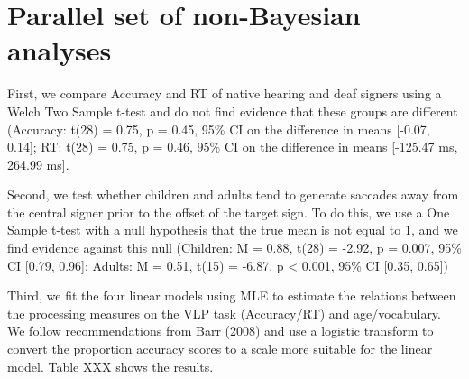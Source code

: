 \documentclass[oneside]{report}
\begin{document}
\section{Parallel set of non-Bayesian
analyses}\label{parallel-set-of-non-bayesian-analyses}

First, we compare Accuracy and RT of native hearing and deaf signers
using a Welch Two Sample t-test and do not find evidence that these
groups are different (Accuracy: t(28) = 0.75, p = 0.45, 95\% CI on the
difference in means {[}-0.07, 0.14{]}; RT: t(28) = 0.75, p = 0.46, 95\%
CI on the difference in means {[}-125.47 ms, 264.99 ms{]}.

Second, we test whether children and adults tend to generate saccades
away from the central signer prior to the offset of the target sign. To
do this, we use a One Sample t-test with a null hypothesis that the true
mean is not equal to 1, and we find evidence against this null
(Children: M = 0.88, t(28) = -2.92, p = 0.007, 95\% CI {[}0.79, 0.96{]};
Adults: M = 0.51, t(15) = -6.87, p \textless{} 0.001, 95\% CI {[}0.35,
0.65{]})

Third, we fit the four linear models using MLE to estimate the relations
between the processing measures on the VLP task (Accuracy/RT) and
age/vocabulary. We follow recommendations from Barr (2008) and use a
logistic transform to convert the proportion accuracy scores to a scale
more suitable for the linear model. Table XXX shows the results.
\begin{table}

\caption[Results for MLE models]{\label{tab:unnamed-chunk-12}Results for the four linear models fit using Maxiumum Likelihood Estimation. All p-values are one-sided to reflect our directional hypotheses about the VLP measures improving over development.}
\centering
{}
\end{table}
\end{document}

